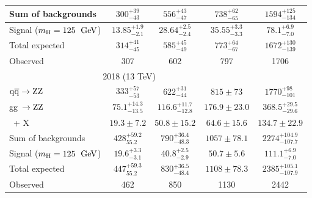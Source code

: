 \begin{table}[!hb]
\begin{center}
\begin{tabular}{|l|c|c|c|c|}
\hline
Sum of backgrounds & $300^{+ 39}_{- 43}$ & $556^{+ 43}_{- 47}$ & $738^{+ 62}_{- 65}$ & $1594^{+ 125}_{- 134}$ \\
\hline
Signal ($m_{\mathrm{H}}=125~\hbox{$\;\hbox{\rm GeV}$}$) & $13.85^{+ 1.9}_{- 2.1}$ & $28.64^{+ 2.5}_{- 2.4}$ & $35.55^{+ 3.3}_{- 3.3}$ & $78.1^{+ 6.9}_{- 7.0}$ \\
\hline
Total expected & $314^{+ 41}_{- 45}$ & $585^{+ 45}_{- 49}$ & $773^{+ 64}_{- 67}$ & $1672^{+ 130}_{-139}$ \\
\hline
Observed & 307 & 602 & 797 & 1706 \\
\hline \hline
\multicolumn{4}{|c|}{2018 (13 TeV)}  \\
\hline
\hline
        $\mathrm{q}\mathrm{\overline{q}} \rightarrow \mathrm{Z}\mathrm{Z}$ & $333^{+57}_{-53}$ & $622^{+31}_{-44}$ & $815\pm73$ & $1770^{+98}_{-101}$ \\
        gg~$\rightarrow \mathrm{Z}\mathrm{Z}$ & $75.1^{+14.3}_{-13.5}$ & $116.6^{+11.7}_{-12.8}$ & $176.9\pm23.0$ & $368.5^{+29.5}_{-29.6}$ \\
        \Z\ + X & $19.3\pm7.2$ & $50.8\pm15.2$ & $64.6\pm15.6$ & $134.7\pm22.9$ \\
        \hline
        Sum of backgrounds & $428^{+59.2}_{55.2}$ & $790^{+36.4}_{-48.3}$ & $1057\pm78.1$ & $2274^{+104.9}_{-107.7}$ \\
        \hline
        Signal ($m_{\mathrm{H}}=125~\hbox{$\;\hbox{\rm GeV}$}$) & $19.6^{+3.3}_{-3.1}$ & $40.8^{+2.5}_{-2.9}$ & $50.7\pm5.6$ & $111.1^{+6.9}_{-7.0}$ \\
        \hline
        Total expected & $447^{+59.3}_{55.2}$ & $830^{+36.5}_{-48.4}$ & $1108\pm78.3$ & $2385^{+105.1}_{-107.9}$ \\
        \hline
        Observed & 462 & 850 & 1130 & 2442 \\
        \hline
        \hline
\hline \hline
\end{tabular}
\end{center}
\end{table}















